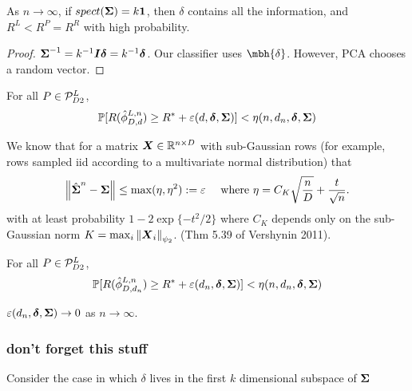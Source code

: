 \documentclass[10pt]{article}
\begin{document}
\begin{thm}
	As $n \to \infty$, if $spect(\boldsymbol{\Sigma})=k \boldsymbol{1}$, then $\delta$ contains all the information, and $R^L < R^P = R^R$ with high probability. 
\end{thm}

\begin{proof}
$\boldsymbol{\Sigma}^{-1}=k^{-1} \boldsymbol{I} \boldsymbol{\delta} = k^{-1} \boldsymbol{\delta}$. 
Our classifier uses $\mbh{\delta}$.  However,  PCA chooses a random vector.
\end{proof}


\begin{thm}
For all $P \in \mathcal{P}^L_{D2}$, 
\begin{align}
	\mathbb{P}[R(\hat{\phi}_{D,d}^{L,n}) \geq R^* + \varepsilon(d,\boldsymbol{\delta},\boldsymbol{\Sigma})] < \eta(n,d_n,\boldsymbol{\delta},\boldsymbol{\Sigma})
\end{align}
\end{thm}

We know that for a matrix $\boldsymbol{X} \in \mathbb{R}^{n \times D}$ with sub-Gaussian rows (for example, rows sampled iid according to a multivariate normal distribution) that
\begin{align}
	\left \lVert\hat{\boldsymbol{\Sigma}}^n - \boldsymbol{\Sigma} \right \rVert \leq \max(\eta,\eta^2) := \varepsilon \quad \text{ where } \eta=C_K \sqrt{\frac{n}{D}} + \frac{t}{\sqrt{n}}.
\end{align}
with at least probability $1-2\exp\{-t^2/2\}$ 
where $C_K$ depends only on the sub-Gaussian norm $K=\max_i \left \lVert\boldsymbol{X}_i \right \rVert_{\psi_2}$.
(Thm 5.39 of Vershynin 2011).




\begin{thm}
For all $P \in \mathcal{P}^L_{D2}$, 
\begin{align}
	\mathbb{P}[R(\hat{\phi}_{D,d_n}^{L,n}) \geq R^* + \varepsilon(d_n,\boldsymbol{\delta},\boldsymbol{\Sigma})] < \eta(n,d_n,\boldsymbol{\delta},\boldsymbol{\Sigma})
\end{align}
\end{thm}




\begin{cor}
$\varepsilon(d_n,\boldsymbol{\delta},\boldsymbol{\Sigma}) \rightarrow 0$ as $n \to \infty$.
\end{cor}




\subsubsection{don't forget this stuff} %
\label{sub:don_t_forget_this_stuff}

Consider the case in which $\delta$ lives in the first $k$ dimensional subspace of $\boldsymbol{\Sigma}$
\end{document}
